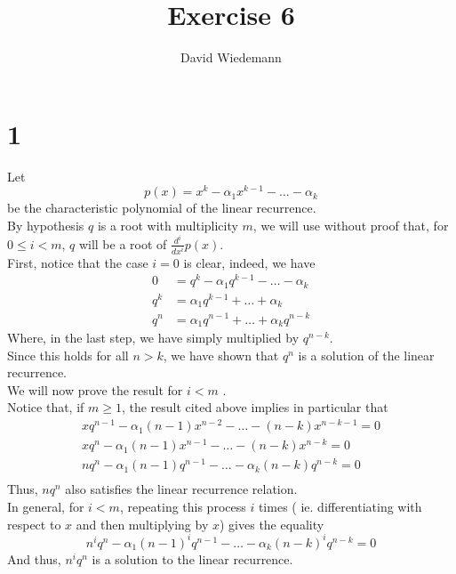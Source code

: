 \documentclass[11pt, a4paper]{article}
\begin{document}
\title{Exercise 6}
\author{David Wiedemann}
\maketitle
\section*{1}
Let 
\[ 
	p( x) = x^{k}- \alpha_1 x^{k-1} - \ldots - \alpha_{k} 
\]
be the characteristic polynomial of the linear recurrence.\\
By hypothesis $q$ is a root with multiplicity $m$, we will use without proof that, for $0\leq i<m$,  $q$ will be a root of $ \frac{d^{i}}{dx^{i}}p( x) $.\\
First, notice that the case $i=0$ is clear, indeed, we have
\begin{align*}
	 0 &=q^{k} - \alpha_1 q^{k-1} - \ldots - \alpha_k \\
	q^{k}&= \alpha_1 q^{k-1} + \ldots + \alpha_k\\
	q^{n} &= \alpha_1 q^{n-1} + \ldots + \alpha_k q^{n-k}
\end{align*}
Where, in the last step, we have simply multiplied by $q^{n-k}$.\\
Since this holds for all $n>k$, we have shown that $q^{n}$ is a solution of the linear recurrence.\\
We will now prove the result for $i<m$ .\\
Notice that, if $m\geq 1$, the result cited above implies in particular that
\begin{align*}
	x q^{n-1} - \alpha_1( n-1)  x^{n-2} - \ldots - ( n-k) x^{n-k-1} = 0\\
	x q^{n} - \alpha_1( n-1)  x^{n-1} - \ldots - ( n-k) x^{n-k} = 0\\
	n q^{n} - \alpha_1 ( n-1) q^{n-1} - \ldots - \alpha_k( n-k) q^{n-k} = 0\\
\end{align*}
Thus,  $nq^{n}$ also satisfies the linear recurrence relation.\\
In general, for $i<m$, repeating this process $i$ times ( ie. differentiating with respect to $x$ and then multiplying by $x$) gives the equality
\[ 
	n^{i}q^{n} - \alpha_1 ( n-1) ^{i} q^{n-1} - \ldots - \alpha_k ( n-k)^{i}  q^{n-k}=0
\]
And thus, $n^{i}q^{n}$ is a solution to the linear recurrence.\\
\end{document}
